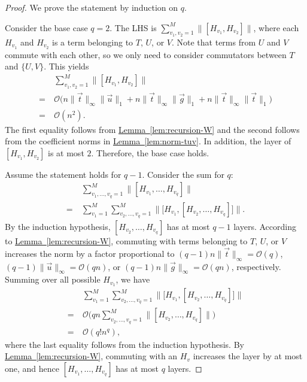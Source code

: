 \documentclass[aps,pra,reprint,groupedaddress,floatfix]{revtex4-2}
\newcommand{\lem}[1]{\hyperref[lem:#1]{Lemma~\ref*{lem:#1}}}
\begin{document}
\begin{proof}
    We prove the statement by induction on $q$. 
    
    Consider the base case $q=2$. The LHS is $\sum_{v_1, v_2=1}^{M} \|[H_{v_1}, H_{v_2}]\|$, where each $H_{v_1}$ and $H_{v_2}$ is a term belonging to $T$, $U$, or $V$. Note that terms from $U$ and $V$ commute with each other, so we only need to consider commutators between $T$ and $\{U,V\}$. This yields
    \begin{align*}
        &\sum_{v_1, v_2=1}^{M} \|[H_{v_1}, H_{v_2}]\| \\
        =~&  \mathcal{O}\big(n\|\vec{t}\|_{\infty} \|\vec{u}\|_1+ n\|\vec{t}\|_{\infty} \|\vec{g}\|_1 + n\|\vec{t}\|_{\infty} \|\vec{t}\|_1\big) \\
        =~& \mathcal{O}(n^2).
    \end{align*}
    The first equality follows from \lem{recursion-W} and the second follows from the coefficient norms in \lem{norm-tuv}. In addition, the layer of $[H_{v_1}, H_{v_2}]$ is at most $2$. Therefore, the base case holds. 
    
    Assume the statement holds for $q-1$. Consider the sum for $q$: 
    \begin{align*}
         &\sum_{v_1, \ldots, v_q=1}^{M} \|[H_{v_1}, \ldots, H_{v_q}]\| \\
         =~& \sum_{v_1=1}^M  \sum_{v_2, \ldots, v_q=1}^{M} \Big\| \big[H_{v_1}, [H_{v_2}, \ldots, H_{v_q}] \big] \Big\|. 
    \end{align*} 
    By the induction hypothesis, $[H_{v_2}, \ldots, H_{v_q}]$ has at most $q-1$ layers.
    According to \lem{recursion-W}, commuting with terms belonging to $T$, $U$, or $V$ increases the norm by a factor proportional to $(q-1)n\|\vec{t}\|_\infty = \mathcal{O}(q)$, $(q-1)\|\vec{u}\|_\infty =\mathcal{O}(qn)$, or $(q-1)n\|\vec{g}\|_\infty=\mathcal{O}(qn)$, respectively. Summing over all possible $H_{v_1}$, we have
    \begin{align*}
        & \sum_{v_1=1}^M \sum_{v_2, \ldots, v_q=1}^{M} \Big\| \big[H_{v_1}, [H_{v_2}, \ldots, H_{v_q}] \big] \Big\| \\
        =~&  \mathcal{O}\Big(qn \sum_{v_2, \ldots, v_q=1}^{M} \|[H_{v_2}, \ldots, H_{v_q}]\|\Big) \\
        =~&  \mathcal{O}(q!n^{q}),
    \end{align*}
    where the last equality follows from the induction hypothesis. By \lem{recursion-W}, commuting with an $H_v$ increases the layer by at most one, and hence $[H_{v_1}, \ldots, H_{v_q}]$ has at most $q$ layers.
\end{proof}
\end{document}
